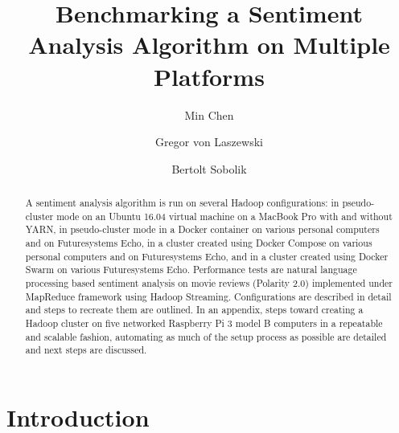 \title{Benchmarking a Sentiment Analysis Algorithm on Multiple Platforms}


\author{Min Chen}

\author{Gregor von Laszewski}

\author{Bertolt Sobolik}


\renewcommand{\shortauthors}{M. Chen, G. v. Laszewski, B. Sobolik}


\begin{abstract}
A sentiment analysis algorithm is run on several Hadoop
configurations: in pseudo-cluster mode on an Ubuntu 16.04 virtual
machine on a MacBook Pro with and without YARN, in pseudo-cluster mode
in a Docker container on various personal computers and on
Futuresystems Echo, in a cluster created using Docker Compose on
various personal computers and on Futuresystems Echo, and in a cluster
created using Docker Swarm on various Futuresystems Echo. Performance
tests are natural language processing based sentiment analysis on
movie reviews (Polarity 2.0) implemented under MapReduce framework
using Hadoop Streaming. Configurations are described in detail and
steps to recreate them are outlined. In an appendix, steps toward
creating a Hadoop cluster on five networked Raspberry Pi 3 model B
computers in a repeatable and scalable fashion, automating as much of
the setup process as possible are detailed and next steps are
discussed.
\end{abstract}



\maketitle

\section{Introduction}


